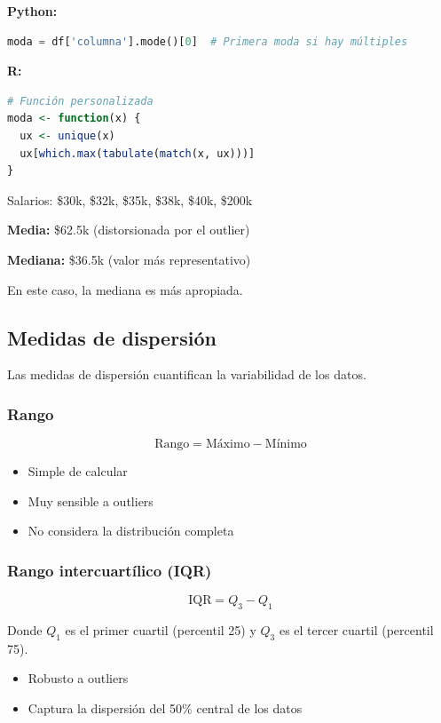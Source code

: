 \documentclass[a4paper,11pt]{article}
\begin{document}
\textbf{Python:}
\begin{lstlisting}[language=Python]
moda = df['columna'].mode()[0]  # Primera moda si hay múltiples
\end{lstlisting}

\textbf{R:}
\begin{lstlisting}[language=R]
# Función personalizada
moda <- function(x) {
  ux <- unique(x)
  ux[which.max(tabulate(match(x, ux)))]
}
\end{lstlisting}

\begin{tcolorbox}[colback=ejemplocolor!20, colframe=unidadcolor, title=Ejemplo: Media vs Mediana]
Salarios: \$30k, \$32k, \$35k, \$38k, \$40k, \$200k

\textbf{Media:} \$62.5k (distorsionada por el outlier)

\textbf{Mediana:} \$36.5k (valor más representativo)

En este caso, la mediana es más apropiada.
\end{tcolorbox}

\subsection{Medidas de dispersión}

Las medidas de dispersión cuantifican la variabilidad de los datos.

\subsubsection{Rango}

$$\text{Rango} = \text{Máximo} - \text{Mínimo}$$

\begin{itemize}
    \item Simple de calcular
    \item Muy sensible a outliers
    \item No considera la distribución completa
\end{itemize}

\subsubsection{Rango intercuartílico (IQR)}

$$\text{IQR} = Q_3 - Q_1$$

Donde $Q_1$ es el primer cuartil (percentil 25) y $Q_3$ es el tercer cuartil (percentil 75).

\begin{itemize}
    \item Robusto a outliers
    \item Captura la dispersión del 50\% central de los datos
\end{itemize}
\end{document}
